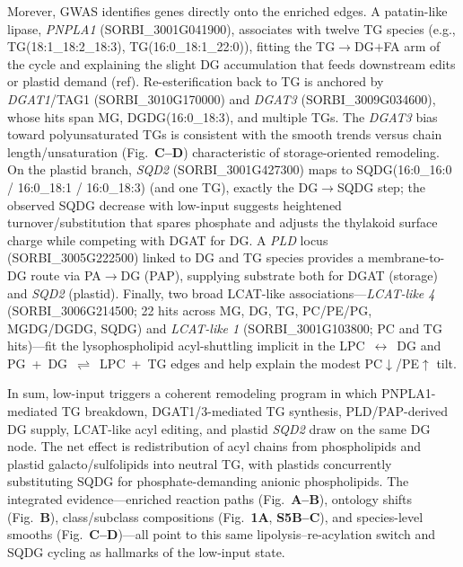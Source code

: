 \documentclass[10pt,letterpaper]{article}
\begin{document}
Morever, GWAS identifies genes directly onto the enriched edges. A patatin-like lipase, \textit{PNPLA1} (SORBI\_3001G041900), associates with twelve TG species (e.g., TG(18{:}1\_18{:}2\_18{:}3), TG(16{:}0\_18{:}1\_22{:}0)), fitting the TG$\rightarrow$DG$+$FA arm of the cycle and explaining the slight DG accumulation that feeds downstream edits or plastid demand (ref). Re-esterification back to TG is anchored by \textit{DGAT1}/TAG1 (SORBI\_3010G170000) and \textit{DGAT3} (SORBI\_3009G034600), whose hits span MG, DGDG(16{:}0\_18{:}3), and multiple TGs. The \textit{DGAT3} bias toward polyunsaturated TGs is consistent with the smooth trends versus chain length/unsaturation (Fig.\ \textbf{C–D}) characteristic of storage-oriented remodeling. On the plastid branch, \textit{SQD2} (SORBI\_3001G427300) maps to SQDG(16{:}0\_16{:}0 / 16{:}0\_18{:}1 / 16{:}0\_18{:}3) (and one TG), exactly the DG$\rightarrow$SQDG step; the observed SQDG decrease with low-input suggests heightened turnover/substitution that spares phosphate and adjusts the thylakoid surface charge while competing with DGAT for DG. A \textit{PLD} locus (SORBI\_3005G222500) linked to DG and TG species provides a membrane-to-DG route via PA$\rightarrow$DG (PAP), supplying substrate both for DGAT (storage) and \textit{SQD2} (plastid). Finally, two broad LCAT-like associations—\textit{LCAT-like 4} (SORBI\_3006G214500; 22 hits across MG, DG, TG, PC/PE/PG, MGDG/DGDG, SQDG) and \textit{LCAT-like 1} (SORBI\_3001G103800; PC and TG hits)—fit the lysophospholipid acyl-shuttling implicit in the \mbox{LPC $\leftrightarrow$ DG} and \mbox{PG + DG $\rightleftharpoons$ LPC + TG} edges and help explain the modest PC$\downarrow$/PE$\uparrow$ tilt.

In sum, low-input triggers a coherent remodeling program in which PNPLA1-mediated TG breakdown, DGAT1/3-mediated TG synthesis, PLD/PAP-derived DG supply, LCAT-like acyl editing, and plastid \textit{SQD2} draw on the same DG node. The net effect is redistribution of acyl chains from phospholipids and plastid galacto/sulfolipids into neutral TG, with plastids concurrently substituting SQDG for phosphate-demanding anionic phospholipids. The integrated evidence—enriched reaction paths (Fig.\ \textbf{A–B}), ontology shifts (Fig.\ \textbf{B}), class/subclass compositions (Fig.\ \textbf{1A}, \textbf{S5B–C}), and species-level smooths (Fig.\ \textbf{C–D})—all point to this same lipolysis–re-acylation switch and SQDG cycling as hallmarks of the low-input state.
\end{document}
